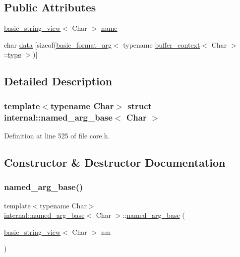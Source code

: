 \subsection*{Public Attributes}
\begin{DoxyCompactItemize}
\item 
\hyperlink{classbasic__string__view}{basic\+\_\+string\+\_\+view}$<$ Char $>$ \hyperlink{structinternal_1_1named__arg__base_a06a112fdd55d3e5ad86d0d1c343e63e0}{name}
\item 
char \hyperlink{structinternal_1_1named__arg__base_a739cb7625a031b68ca059d7f491f6270}{data} \mbox{[}sizeof(\hyperlink{classbasic__format__arg}{basic\+\_\+format\+\_\+arg}$<$ typename \hyperlink{structbuffer__context}{buffer\+\_\+context}$<$ Char $>$\+::\hyperlink{namespaceinternal_a8661864098ac0acff9a6dd7e66f59038}{type} $>$)\mbox{]}
\end{DoxyCompactItemize}


\subsection{Detailed Description}
\subsubsection*{template$<$typename Char$>$\newline
struct internal\+::named\+\_\+arg\+\_\+base$<$ Char $>$}



Definition at line 525 of file core.\+h.



\subsection{Constructor \& Destructor Documentation}
\mbox{\label{structinternal_1_1named__arg__base_aafeb592879eaf163dea5d7a74219fba5}} 
\subsubsection{\texorpdfstring{named\+\_\+arg\+\_\+base()}{named\_arg\_base()}}
{\footnotesize\ttfamily template$<$typename Char$>$ \\
\hyperlink{structinternal_1_1named__arg__base}{internal\+::named\+\_\+arg\+\_\+base}$<$ Char $>$\+::\hyperlink{structinternal_1_1named__arg__base}{named\+\_\+arg\+\_\+base} (\begin{DoxyParamCaption}\item[{\hyperlink{classbasic__string__view}{basic\+\_\+string\+\_\+view}$<$ Char $>$}]{nm }\end{DoxyParamCaption})\hspace{0.3cm}{\ttfamily [inline]}}



